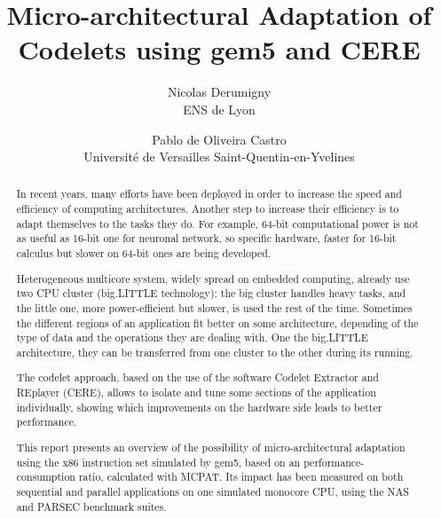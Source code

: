 \documentclass{article}
\title{Micro-architectural Adaptation of Codelets using gem5 and CERE}
\author{Nicolas Derumigny \\
\small ENS de Lyon 
\and Pablo de Oliveira Castro\\ 
\small Université de Versailles Saint-Quentin-en-Yvelines}
\date{}
\begin{document}
\maketitle

\smallskip

\begin{abstract}
In recent years, many efforts have been deployed in order to increase the speed and efficiency of computing architectures. Another step to increase their efficiency is to adapt themselves to the tasks they do. For example, 64-bit computational power is not as useful as 16-bit one for neuronal network, so specific hardware, faster for 16-bit calculus but slower on 64-bit ones are being developed.

Heterogeneous multicore system, widely spread on embedded computing, already use two CPU cluster (big.LITTLE technology): the big cluster handles heavy tasks, and the little one, more power-efficient but slower, is used the rest of the time. Sometimes the different regions of an application fit better on some architecture, depending of the type of data and the operations they are dealing with. One the big.LITTLE architecture, they can be transferred from one cluster to the other during its running. 


The codelet approach, based on the use of the software Codelet Extractor and REplayer (CERE), allows to isolate and tune some sections of the application individually, showing which improvements on the hardware side leads to better performance. 


This report presents an overview of the possibility of micro-architectural adaptation using the x86 instruction set simulated by gem5, based on an performance-consumption ratio, calculated with MCPAT.
 Its impact has been measured on both sequential and parallel applications on one simulated monocore CPU, using the NAS and PARSEC benchmark suites. 

\end{abstract}
\end{document}

